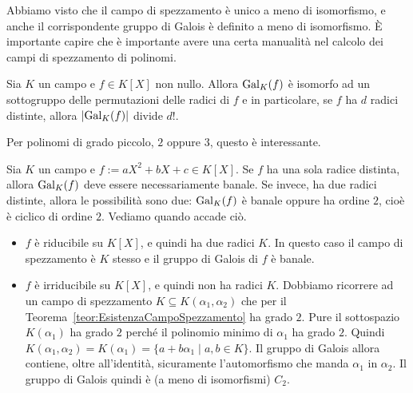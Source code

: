Abbiamo visto che il campo di spezzamento è unico a meno di isomorfismo, e anche il corrispondente gruppo di Galois è definito a meno di isomorfismo. È importante capire che è importante avere una certa manualità nel calcolo dei campi di spezzamento di polinomi.

\begin{coro}
Sia \(K\) un campo e \(f \in K[X]\) non nullo. Allora \(\Gal[K] f\) è isomorfo ad un sottogruppo delle permutazioni delle radici di \(f\) e in particolare, se \(f\) ha \(d\) radici distinte, allora \(\card{\Gal[K]f}\) divide \(d!\).
\end{coro}


Per polinomi di grado piccolo, \(2\) oppure \(3\), questo è interessante.

\begin{esem}
 Sia \(K\) un campo e \(f := aX^2+bX+c \in K[X]\). Se \(f\) ha una sola radice distinta, allora \(\Gal[K]f\) deve essere necessariamente banale. Se invece, ha due radici distinte, allora le possibilità sono due: \(\Gal[K]f\) è banale oppure ha ordine \(2\), cioè è ciclico di ordine \(2\). Vediamo quando accade ciò.
\begin{itemize}
\item \(f\) è riducibile su \(K[X]\), e quindi ha due radici \(K\). In questo caso il campo di spezzamento è \(K\) stesso e il gruppo di Galois di \(f\) è banale.
\item \(f\) è irriducibile su \(K[X]\), e quindi non ha radici \(K\). Dobbiamo ricorrere ad un campo di spezzamento \(K \subseteq K(\alpha_1, \alpha_2)\) che per il Teorema~\ref{teor:EsistenzaCampoSpezzamento} ha grado \(2\). Pure il sottospazio \(K(\alpha_1)\) ha grado \(2\) perché il polinomio minimo di \(\alpha_1\) ha grado \(2\). Quindi \(K(\alpha_1, \alpha_2) = K(\alpha_1) = \{a+b\alpha_1 \mid a, b \in K\}\). Il gruppo di Galois allora contiene, oltre all'identità, sicuramente l'automorfismo che manda \(\alpha_1\) in \(\alpha_2\). Il gruppo di Galois quindi è (a meno di isomorfismi) \(C_2\).
\end{itemize}
\end{esem}

